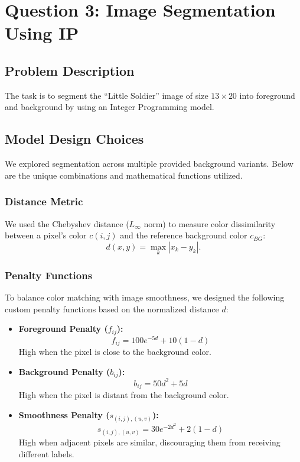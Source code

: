 \documentclass[11pt,a4paper]{article}
\begin{document}
\section*{Question 3: Image Segmentation Using IP}

\subsection*{Problem Description}
The task is to segment the ``Little Soldier'' image of size $13\times 20$ into foreground and background by using an Integer Programming model. 

\subsection*{Model Design Choices}

We explored segmentation across multiple provided background variants. Below are the unique combinations and mathematical functions utilized.

\subsubsection*{Distance Metric}
We used the Chebyshev distance ($L_{\infty}$ norm) to measure color dissimilarity between a pixel's color $c(i,j)$ and the reference background color $c_{BG}$:
\[
d(x,y)=\max_k |x_k-y_k|.
\]

\subsubsection*{Penalty Functions}
To balance color matching with image smoothness, we designed the following custom penalty functions based on the normalized distance $d$:

\begin{itemize}
    \item \textbf{Foreground Penalty ($f_{ij}$):} 
    \[ f_{ij}=100e^{-5d}+10(1-d) \]
    High when the pixel is close to the background color.
    \item \textbf{Background Penalty ($b_{ij}$):} 
    \[ b_{ij}=50d^2+5d \]
    High when the pixel is distant from the background color.
    \item \textbf{Smoothness Penalty ($s_{(i,j),(u,v)}$):} 
    \[ s_{(i,j),(u,v)} = 30e^{-2d^2}+2(1-d) \]
    High when adjacent pixels are similar, discouraging them from receiving different labels.
\end{itemize}
\end{document}

